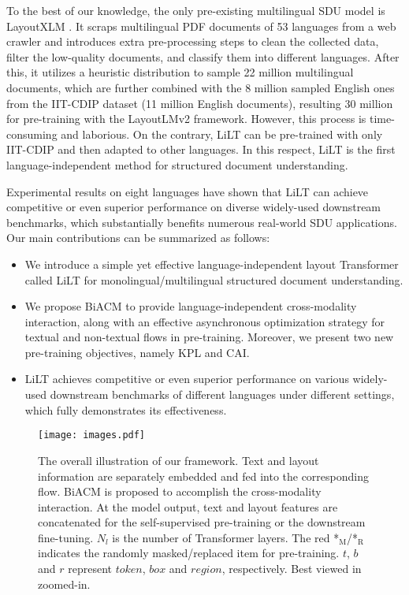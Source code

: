\documentclass[11pt]{article}
\begin{document}
To the best of our knowledge,
the only pre-existing multilingual SDU model is LayoutXLM \cite{xu2021layoutxlm}. It scraps multilingual PDF documents of 53 languages from a web crawler and introduces extra pre-processing steps to clean the collected data, filter the low-quality  documents, and classify them into different languages.  After this, it utilizes a heuristic distribution to sample 22 million multilingual documents, which are further combined with the 8 million sampled English ones from the IIT-CDIP \cite{cdip} dataset (11 million English documents), resulting 30 million for pre-training with the LayoutLMv2 \cite{layoutlmv2} framework. However, this process is time-consuming and laborious.
On the contrary,  LiLT can be pre-trained with only IIT-CDIP  and then adapted to other languages. 
In this respect, 
LiLT is the first language-independent  method for structured document understanding.

Experimental results on eight languages have shown that LiLT  can achieve 
competitive or even superior performance on diverse widely-used downstream benchmarks, 
which substantially benefits numerous real-world SDU  applications. Our main contributions can be summarized as follows:
\begin{itemize}
\item We introduce a simple yet effective language-independent layout Transformer called LiLT for monolingual/multilingual structured document understanding. 
\item We  propose BiACM to provide  language-independent cross-modality  interaction,
along with an effective asynchronous optimization strategy for textual and non-textual flows in pre-training. 
Moreover, we present two new pre-training objectives, namely 
KPL and CAI.
\item LiLT achieves competitive or even superior performance on  various widely-used downstream benchmarks of different languages under 
different settings, which fully demonstrates its effectiveness.
\end{itemize}


\begin{figure*}[t]
\centering
\texttt{[image: images.pdf]}
\caption{The overall  illustration of our framework. 
Text and layout information are separately embedded and fed into the corresponding flow. 
BiACM is proposed to accomplish the cross-modality interaction. At the model output, text and layout features are concatenated for the self-supervised pre-training or the downstream fine-tuning.
$N_l$ is the number of Transformer layers.
The red *$_\mathrm{M}$/*$_\mathrm{R}$ indicates the randomly masked/replaced item for pre-training. $t$, $b$ and $r$ represent $token$, $box$ and $region$, respectively. Best viewed in zoomed-in.} 
\label{pipeline}
\end{figure*}
\end{document}
